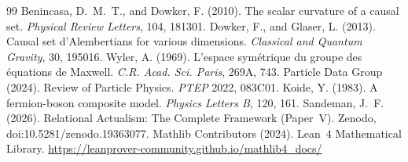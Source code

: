 \documentclass[12pt,a4paper]{article}
\begin{document}

\begin{thebibliography}{99}
 Benincasa, D.~M.~T., and Dowker, F. (2010). The scalar curvature of a causal set. \textit{Physical Review Letters}, 104, 181301.
 Dowker, F., and Glaser, L. (2013). Causal set d'Alembertians for various dimensions. \textit{Classical and Quantum Gravity}, 30, 195016.
 Wyler, A. (1969). L'espace symétrique du groupe des équations de Maxwell. \textit{C.R. Acad. Sci. Paris}, 269A, 743.
 Particle Data Group (2024). Review of Particle Physics. \textit{PTEP} 2022, 083C01.
 Koide, Y. (1983). A fermion-boson composite model. \textit{Physics Letters B}, 120, 161.
 Sandeman, J.~F. (2026). Relational Actualism: The Complete Framework (Paper~V). Zenodo, doi:10.5281/zenodo.19363077.
 Mathlib Contributors (2024). Lean~4 Mathematical Library. \url{https://leanprover-community.github.io/mathlib4_docs/}
\end{thebibliography}
\end{document}
